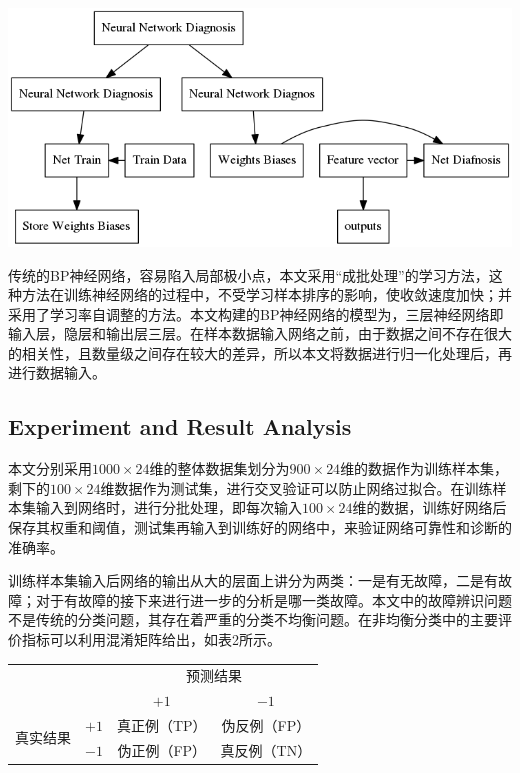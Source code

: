 \documentclass{ctacn}%
\begin{document}
\begin{multicols}{2}
\begin{center}
	\includegraphics[scale=0.44, trim=0 0 0 0]{figs/procedure}
	\label{fig2}
\end{center}

传统的BP神经网络，容易陷入局部极小点，本文采用“成批处理”的学习方法，这种方法在训练神经网络的过程中，不受学习样本排序的影响，使收敛速度加快；并采用了学习率自调整的方法。本文构建的BP神经网络的模型为，三层神经网络即输入层，隐层和输出层三层。在样本数据输入网络之前，由于数据之间不存在很大的相关性，且数量级之间存在较大的差异，所以本文将数据进行归一化处理后，再进行数据输入。

\subsection{Experiment and Result Analysis}

本文分别采用$1000\times24$维的整体数据集划分为$900\times24$维的数据作为训练样本集，剩下的$100\times24$维数据作为测试集，进行交叉验证可以防止网络过拟合。在训练样本集输入到网络时，进行分批处理，即每次输入$100\times24$维的数据，训练好网络后保存其权重和阈值，测试集再输入到训练好的网络中，来验证网络可靠性和诊断的准确率。

训练样本集输入后网络的输出从大的层面上讲分为两类：一是有无故障，二是有故障；对于有故障的接下来进行进一步的分析是哪一类故障。本文中的故障辨识问题不是传统的分类问题，其存在着严重的分类不均衡问题。在非均衡分类中的主要评价指标可以利用混淆矩阵给出，如表2所示。


\begin{center}
	\label{tab:2}
	\begin{tabular} {cccc}\toprule
		\multirow{2}{*}[-2pt]{}&\multirow{2}{*}[-2pt]{}&\multicolumn{2}{c}{预测结果}\\
		\cmidrule(lr){3-4}
		&&$+1$&$-1$\\\hline
		\multirow{2}{*}[-2pt]{真实结果}&$+1$&真正例（TP）&伪反例（FP）\\
		&$-1$&伪正例（FP）&真反例（TN）\\
		\bottomrule
\end{tabular}\end{center}


\end{multicols}
\end{document}
